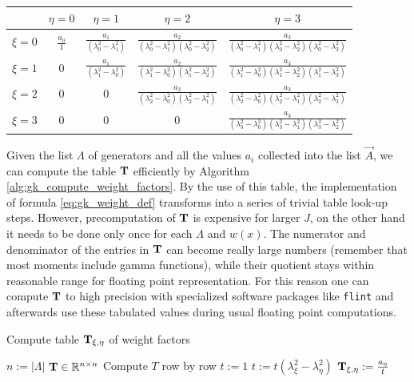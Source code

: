 \documentclass[a4paper,10pt]{article}
\begin{document}
\begin{center}
\begin{tabular}{|c|cccc|}
  \hline
  {}    & $\eta=0$ & $\eta=1$ & $\eta=2$ & $\eta=3$ \\
  \hline
  $\xi=0$ & $\frac{a_0}{1}$
          & $\frac{a_1}{(\lambda_0^2-\lambda_1^2)}$
          & $\frac{a_2}{(\lambda_0^2-\lambda_1^2)(\lambda_0^2-\lambda_2^2)}$
          & $\frac{a_3}{(\lambda_0^2-\lambda_1^2)(\lambda_0^2-\lambda_2^2)(\lambda_0^2-\lambda_3^2)}$ \\
  $\xi=1$ & 0
          & $\frac{a_1}{(\lambda_1^2-\lambda_0^2)}$
          & $\frac{a_2}{(\lambda_1^2-\lambda_0^2)(\lambda_1^2-\lambda_2^2)}$
          & $\frac{a_3}{(\lambda_1^2-\lambda_0^2)(\lambda_1^2-\lambda_2^2)(\lambda_1^2-\lambda_3^2)}$ \\
  $\xi=2$ & 0
          & 0
          & $\frac{a_2}{(\lambda_2^2-\lambda_0^2)(\lambda_2^2-\lambda_1^2)}$
          & $\frac{a_3}{(\lambda_2^2-\lambda_0^2)(\lambda_2^2-\lambda_1^2)(\lambda_2^2-\lambda_3^2)}$ \\
  $\xi=3$ & 0
          & 0
          & 0
          & $\frac{a_3}{(\lambda_3^2-\lambda_0^2)(\lambda_3^2-\lambda_1^2)(\lambda_3^2-\lambda_2^2)}$ \\
  \hline
\end{tabular}
\end{center}

Given the list $\Lambda$ of generators and all the values $a_{i}$ collected into
the list $\vec{A}$, we can compute the table $\mathbf{T}$ efficiently by Algorithm
\ref{alg:gk_compute_weight_factors}. By the use of this table, the implementation
of formula \eqref{eq:gk_weight_def} transforms into a series of trivial table
look-up steps. However, precomputation of $\mathbf{T}$ is expensive for larger $J$,
on the other hand it needs to be done only once for each $\Lambda$ and $w(x)$.
The numerator and denominator of the entries in $\mathbf{T}$ can become really large
numbers (remember that most moments include gamma functions), while their quotient
stays within reasonable range for floating point representation. For this reason
one can compute $\mathbf{T}$ to high precision with specialized software packages
like \texttt{flint} \cite{flint, Hart2010} and afterwards use these tabulated
values during usual floating point computations.

\begin{algorithm}[h!]
  \caption{Compute table $\mathbf{T}_{\xi,\eta}$ of weight factors}
  \label{alg:gk_compute_weight_factors}
  \begin{algorithmic}
      \State $n := |\Lambda|$
      \State $\mathbf{T} \in \mathbb{R}^{n\times n}$
      \Comment Compute $T$ row by row
        \State $t := 1$
          \If{$\xi \neq \eta$}
            \State $t := t \left(\lambda_{\xi}^{2} - \lambda_{\eta}^{2}\right)$
          \EndIf
          \If{$\eta \geq \xi$}
            \State $\mathbf{T}_{\xi,\eta} := \frac{a_{\eta}}{t}$
          \EndIf
        \EndFor
      \EndFor
    \EndProcedure
  \end{algorithmic}
\end{algorithm}
\end{document}
